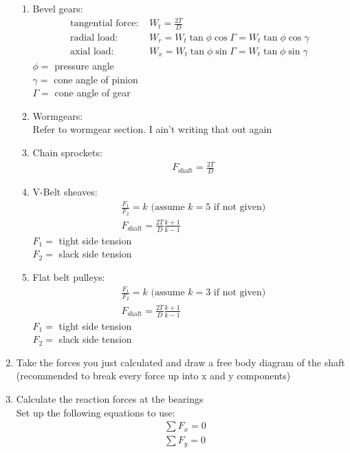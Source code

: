 \documentclass[11pt, fleqn]{article}
\begin{document}
\begin{enumerate}
\begin{enumerate}
        \item Bevel gears:
        \begin{align*}
            \text{tangential force: }&W_t=\frac{2T}{D}\\
            \text{radial load: }&W_r=W_t\tan\phi\cos\Gamma=W_t\tan\phi\cos\gamma\\
            \text{axial load: }&W_x=W_t\tan\phi\sin\Gamma=W_t\tan\phi\sin\gamma
        \end{align*}
        $\phi=$ pressure angle\\
        $\gamma=$ cone angle of pinion\\
        $\Gamma=$ cone angle of gear
        \item Wormgears:\\
        Refer to wormgear section. I ain't writing that out again
        \item Chain sprockets:
        \begin{align*}
            &F_\text{shaft}=\frac{2T}{D}
        \end{align*}
        \item V-Belt sheaves:
        \begin{align*}
            &\frac{F_1}{F_2}=k\text{ (assume $k=5$ if not given)}\\
            &F_\text{shaft}=\frac{2T}{D}\frac{k+1}{k-1}
        \end{align*}
        $F_1=$ tight side tension\\
        $F_2=$ slack side tension
        \item Flat belt pulleys:
        \begin{align*}
            &\frac{F_1}{F_2}=k\text{ (assume $k=3$ if not given)}\\
            &F_\text{shaft}=\frac{2T}{D}\frac{k+1}{k-1}
        \end{align*}
        $F_1=$ tight side tension\\
        $F_2=$ slack side tension
    \end{enumerate}
    \item Take the forces you just calculated and draw a free body diagram of the shaft (recommended to break every force up into x and y components)
    \item Calculate the reaction forces at the bearings\\
    Set up the following equations to use:
    \begin{align*}
        &\sum F_x=0\\
        &\sum F_y=0\\

\end{align*}
\end{enumerate}
\end{document}
